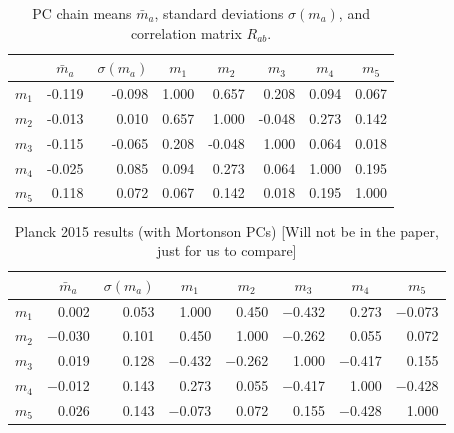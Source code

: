 \documentclass[prd,twocolumn,amsmath,amssymb,floatfix,superscriptaddress,nofootinbib]{revtex4-1}
\begin{document}
\begin{table}[b]
\centering
\caption{PC chain means $\bar m_a$, standard deviations $\sigma(m_a)$, and correlation matrix $R_{ab}$.}
\label{tab:PC_stats}
\begin{tabular}{|r | r r@{\hskip 0.06in}|r r r r r|}
\hline
		
			  &  \multicolumn{1}{c}{$\bar m_a$} & \multicolumn{1}{c}{$\sigma(m_a)$}	 & \multicolumn{1}{|c}{$m_1$} & \multicolumn{1}{c}{$m_2$} & \multicolumn{1}{c}{$m_3$} & \multicolumn{1}{c}{$m_4$} & \multicolumn{1}{c|}{$m_5$} 
		\\ \hline
		

$m_1$ & -0.119 & -0.098 & 1.000 & 0.657 & 0.208 & 0.094 & 0.067 \\ 
$m_2$ & -0.013 & 0.010 & 0.657 & 1.000 & -0.048 & 0.273 & 0.142 \\ 
$m_3$ & -0.115 & -0.065 & 0.208 & -0.048 & 1.000 & 0.064 & 0.018 \\ 
$m_4$ & -0.025 & 0.085  & 0.094 & 0.273 & 0.064 & 1.000 & 0.195 \\ 
$m_5$ & 0.118 & 0.072  & 0.067 & 0.142 & 0.018 & 0.195 & 1.000 \\ 

\hline
\end{tabular}
\end{table}

\begin{table}[b]
\centering
\caption{Planck 2015 results (with Mortonson PCs) [Will not be in the paper, just for us to compare] }
\label{tab:PC_stats}
\begin{tabular}{|r | r r@{\hskip 0.06in}|r r r r r|}
\hline
		
			  &  \multicolumn{1}{c}{$\bar m_a$} & \multicolumn{1}{c}{$\sigma(m_a)$}	 & \multicolumn{1}{|c}{$m_1$} & \multicolumn{1}{c}{$m_2$} & \multicolumn{1}{c}{$m_3$} & \multicolumn{1}{c}{$m_4$} & \multicolumn{1}{c|}{$m_5$} 
		\\ \hline

$m_1$ 
	& 0.002 & 0.053 & 1.000 & 0.450 & $-$0.432 & 0.273 & $-$0.073 \\ 
$m_2$ 
	& $-$0.030 &  0.101 & 0.450 & 1.000 & $-$0.262 & 0.055 & 0.072 \\ 
$m_3$ 
	& 0.019 &  0.128 & $-$0.432 & $-$0.262 &1.000 & $-$0.417 & 0.155 \\
$m_4$  
	& $-$0.012 & 0.143 &  0.273 & 0.055 & $-$0.417 & 1.000 & $-$0.428 \\ 
$m_5$ 
	& 0.026 & 0.143 & $-$0.073 & 0.072 & 0.155 & $-$0.428 & 1.000\\ 
\hline
\end{tabular}
\end{table}
\end{document}
